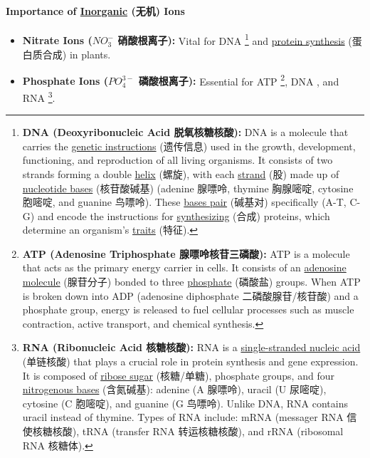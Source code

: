 \paragraph{Importance of \underline{Inorganic} (无机) Ions}
\begin{itemize}
    \item \textbf{Nitrate Ions ($NO_3^-$ 硝酸根离子):} Vital for DNA \footnote{\textbf{DNA (Deoxyribonucleic Acid 脱氧核糖核酸):} DNA
    is a molecule that carries the \underline{genetic instructions} (遗传信息) used in the growth, development, functioning, and
    reproduction of all living organisms. It consists of two strands forming a double \underline{helix} (螺旋), with each
    \underline{strand} (股) made up of \underline{nucleotide bases} (核苷酸碱基) (adenine 腺嘌呤, thymine 胸腺嘧啶, cytosine 胞嘧啶,
    and guanine 鸟嘌呤). These \underline{bases pair} (碱基对) specifically (A-T, C-G) and encode the instructions for \underline{synthesizing} (合成)
    proteins, which determine an organism's \underline{traits} (特征).} and \underline{protein synthesis} (蛋白质合成) in plants.
    \item \textbf{Phosphate Ions ($PO_4^{3-}$ 磷酸根离子):} Essential for ATP \footnote{\textbf{ATP (Adenosine Triphosphate
    腺嘌呤核苷三磷酸):} ATP is a molecule that acts as the primary energy carrier in cells. It consists of an \underline{adenosine
    molecule} (腺苷分子) bonded to three \underline{phosphate} (磷酸盐) groups. When ATP is broken down into ADP (adenosine
    diphosphate 二磷酸腺苷/核苷酸) and a phosphate group, energy is released to fuel cellular processes such as muscle contraction,
    active transport, and chemical synthesis.}, DNA \footnotemark[3], and RNA \footnote{\textbf{RNA (Ribonucleic Acid 核糖核酸):}
    RNA is a \underline{single-stranded nucleic acid} (单链核酸) that plays a crucial role in protein synthesis and gene
    expression. It is composed of \underline{ribose sugar} (核糖/单糖), phosphate groups, and four \underline{nitrogenous bases}
    (含氮碱基): adenine (A 腺嘌呤), uracil (U 尿嘧啶), cytosine (C 胞嘧啶), and guanine (G 鸟嘌呤). Unlike DNA, RNA contains uracil
    instead of thymine. Types of RNA include: mRNA \footnotemark[6] (messager RNA 信使核糖核酸), tRNA \footnotemark[7] (transfer
    RNA 转运核糖核酸), and rRNA \footnotemark[8] (ribosomal RNA 核糖体).}.
\end{itemize}
